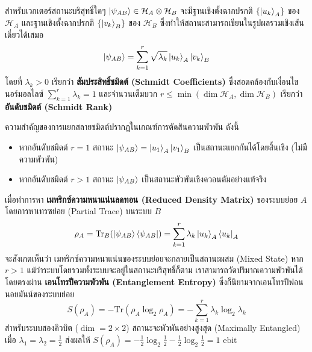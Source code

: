 \begin{tcolorbox}[colback=rbruLightBg, colframe=cyberBlue, arc=2mm, title=\textbf{ทฤษฎีบท ---- การแยกสลายชมิดต์ (Schmidt Decomposition)}]
สำหรับเวกเตอร์สถานะบริสุทธิ์ใดๆ $\ket{\psi_{AB}} \in \mathcal{H}_A \otimes \mathcal{H}_B$ จะมีฐานเชิงตั้งฉากปรกติ $\{\ket{u_k}_A\}$ ของ $\mathcal{H}_A$ และฐานเชิงตั้งฉากปรกติ $\{\ket{v_k}_B\}$ ของ $\mathcal{H}_B$ ซึ่งทำให้สถานะสามารถเขียนในรูปผลรวมเชิงเส้นเดี่ยวได้เสมอ
\begin{equation}
\ket{\psi_{AB}} = \sum_{k=1}^{r} \sqrt{\lambda_k} \ket{u_k}_A \ket{v_k}_B
\label{eq:schmidt_decomposition}
\end{equation}
โดยที่ $\lambda_k > 0$ เรียกว่า \textbf{สัมประสิทธิ์ชมิดต์ (Schmidt Coefficients)} ซึ่งสอดคล้องกับเงื่อนไขนอร์มอลไลซ์ $\sum_{k=1}^r \lambda_k = 1$ และจำนวนเต็มบวก $r \le \min(\dim\mathcal{H}_A, \dim\mathcal{H}_B)$ เรียกว่า \textbf{อันดับชมิดต์ (Schmidt Rank)}
\end{tcolorbox}

ความสำคัญของการแยกสลายชมิดต์ปรากฏในเกณฑ์การตัดสินความพัวพัน ดังนี้
\begin{itemize}
    \item หากอันดับชมิดต์ $r = 1$ สถานะ $\ket{\psi_{AB}} = \ket{u_1}_A \ket{v_1}_B$ เป็นสถานะแยกกันได้โดยสิ้นเชิง (ไม่มีความพัวพัน)
    \item หากอันดับชมิดต์ $r > 1$ สถานะ $\ket{\psi_{AB}}$ เป็นสถานะพัวพันเชิงควอนตัมอย่างแท้จริง
\end{itemize}

เมื่อทำการหา \textbf{เมทริกซ์ความหนาแน่นลดทอน (Reduced Density Matrix)} ของระบบย่อย $A$ โดยการหาเทรซย่อย (Partial Trace) บนระบบ $B$
\begin{equation}
\rho_A = \text{Tr}_B(\ket{\psi_{AB}}\bra{\psi_{AB}}) = \sum_{k=1}^r \lambda_k \ket{u_k}_A\bra{u_k}_A
\label{eq:reduced_rho_A}
\end{equation}
จะสังเกตเห็นว่า เมทริกซ์ความหนาแน่นของระบบย่อยจะกลายเป็นสถานะผสม (Mixed State) หาก $r > 1$ แม้ว่าระบบโดยรวมทั้งระบบจะอยู่ในสถานะบริสุทธิ์ก็ตาม เราสามารถวัดปริมาณความพัวพันได้โดยตรงผ่าน \textbf{เอนโทรปีความพัวพัน (Entanglement Entropy)} ซึ่งก็นิยามจากเอนโทรปีฟอนนอยมันน์ของระบบย่อย
\begin{equation}
S(\rho_A) = -\text{Tr}(\rho_A \log_2 \rho_A) = -\sum_{k=1}^r \lambda_k \log_2 \lambda_k
\label{eq:entanglement_entropy_formula}
\end{equation}
สำหรับระบบสองคิวบิต ($\dim = 2 \times 2$) สถานะจะพัวพันอย่างสูงสุด (Maximally Entangled) เมื่อ $\lambda_1 = \lambda_2 = \frac{1}{2}$ ส่งผลให้ $S(\rho_A) = -\frac{1}{2}\log_2\frac{1}{2} - \frac{1}{2}\log_2\frac{1}{2} = 1\text{ ebit}$

